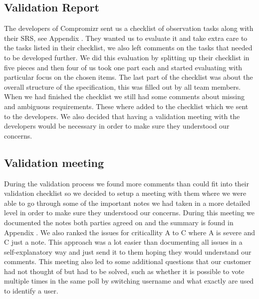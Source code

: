 \documentclass[10pt]{article}
\begin{document}
\subsection{Validation Report}
The developers of Compromizr sent us a checklist of observation tasks along with their SRS, see Appendix \cite{CompromizrChecklist}. They wanted us to evaluate it and take extra care to the tasks listed in their checklist, we also left comments on the tasks that needed to be developed further. We did this evaluation by splitting up their checklist in five pieces and then four of us took one part each and started evaluating with particular focus on the chosen items. The last part of the checklist was about the overall structure of the specification, this was filled out by all team members.
When we had finished the checklist we still had some comments about missing and ambiguous requirements. These where added to the checklist which we sent to the developers. We also decided that having a validation meeting with the developers would be necessary in order to make sure they understood our concerns.

\subsection{Validation meeting}
During the validation process we found more comments than could fit into their validation checklist so we decided to setup a meeting
with them where we were able to go through some of the important notes we had taken in a more detailed level in order to make sure they understood our concerns.  During this meeting we documented the notes both parties agreed on and the summary is found in Appendix \cite{CompromizrValidationMeeting}. We also ranked the issues for criticallity A to C where A is severe and C just a note. This approach was a lot easier than documenting all issues in a self-explanatory way and just send it to them hoping they would understand our comments. This meeting also led to some additional questions that our customer had not thought of but had to be solved, such as whether it is possible to vote multiple times in the same poll by switching username and what exactly are used to identify a user.
\end{document}
